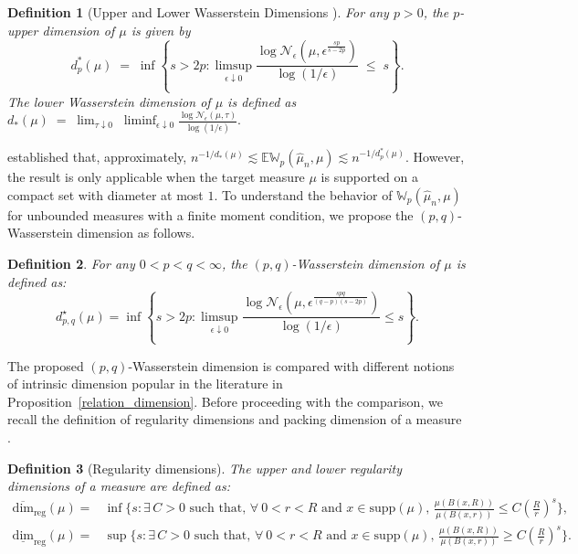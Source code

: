 \documentclass[12pts]{article}
\newtheorem{defn}{Definition}%
\newcommand{\sN}{ \mathscr{N}}
\newcommand{\hmu}{\hat{\mu}}
\newcommand{\E}{\mathbb{E}}
\newcommand{\fW}{\mathbb{W}}
\begin{document}
\begin{defn}[Upper and Lower Wasserstein Dimensions \citep{weed2019sharp}]\label{def1} \normalfont
For any $p > 0$, the $p$-upper dimension of $\mu$ is given by  
\[
d^\ast_p(\mu) \;=\; \inf \left\{ s > 2p : \limsup_{\epsilon \downarrow 0} \frac{\log \sN_{\epsilon}\!\left(\mu, \epsilon^{\tfrac{s p}{s-2 p}}\right)}{\log(1/\epsilon)} \;\leq\; s \right\}.
\]  
The \emph{lower Wasserstein dimension} of $\mu$ is defined as  
\(d_\ast(\mu) \;=\; \lim_{\tau \downarrow 0}\; \liminf_{\epsilon \downarrow 0} \frac{\log \sN_\epsilon(\mu,\tau)}{\log(1/\epsilon)}.\)
\end{defn}
\citet{weed2019sharp} established that, approximately,
\(n^{-1/d_\ast(\mu)} \lesssim \E \fW_p(\hmu_n,\mu) \lesssim n^{-1/d^\ast_p(\mu)}\). However, the result is only applicable when the target measure $\mu$ is supported on a compact set with diameter at most $1$.  To understand the behavior of $\fW_p(\hmu_n,\mu)$ for unbounded measures with a finite moment condition, we propose the $(p, q)$-Wasserstein dimension as follows.
\begin{defn} \label{new_dim}
For any $0< p < q < \infty$, the $(p, q)$-Wasserstein dimension of $\mu$ is defined as:
    \[d^\star_{p, q}(\mu) = \inf \left\{s > 2p: \limsup_{\epsilon \downarrow 0} \frac{\log \sN_\epsilon\left(\mu, \epsilon^{\frac{s  p q }{(q-p)(s - 2 p)}}\right)}{\log(1/\epsilon)} \le s\right\}.\]
\end{defn}

The proposed $(p,q)$-Wasserstein dimension is compared with different notions of intrinsic dimension popular in the literature in Proposition~\ref{relation_dimension}.  Before proceeding with the comparison, we recall the definition of regularity dimensions and packing dimension of a measure \citep{fraser2017upper}.
\begin{defn}[Regularity dimensions]
\normalfont
The upper and lower regularity dimensions of a measure are defined as:
    \begin{align*}
    \overline{\text{dim}}_{\text{reg}}(\mu) = & \inf\bigg\{ s: \exists \, C>0 \text{ such that, } \forall \ 0 < r < R \text{ and } x \in \text{supp}(\mu), \, \frac{\mu(B(x,R))}{\mu(B(x,r))} \le C \left(\frac{R}{r}\right)^s\bigg\},\\
        \underline{\text{dim}}_{\text{reg}}(\mu) = & \sup\bigg\{ s: \exists \, C >0\text{ such that, } \forall \ 0 < r < R  \text{ and } x \in \text{supp}(\mu), \, \frac{\mu(B(x,R))}{\mu(B(x,r))} \ge C \left(\frac{R}{r}\right)^s\bigg\}.
    \end{align*} 
\end{defn}
\end{document}

